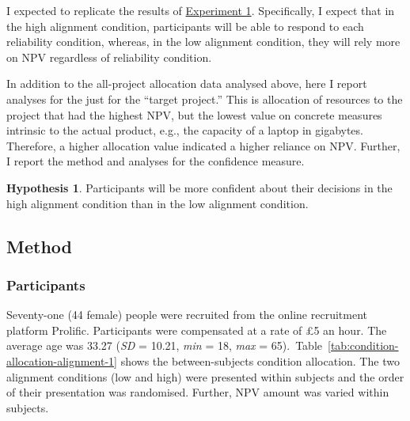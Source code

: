 \documentclass[a4paper, nobind, dvipsnames]{templates/ociamthesis}
\theoremstyle{definition}
\theoremstyle{definition}
\theoremstyle{definition}
\theoremstyle{definition}
\newtheorem{hypothesis}{Hypothesis}[chapter]
\theoremstyle{remark}
\begin{document}
I expected to replicate the results of \protect\hyperlink{results-alignment-2}{Experiment 1}.
Specifically, I expect that in the high alignment condition, participants will
be able to respond to each reliability condition, whereas, in the low alignment
condition, they will rely more on NPV regardless of reliability condition.

In addition to the all-project allocation data analysed above, here I report
analyses for the just for the ``target project.'' This is allocation of resources
to the project that had the highest NPV, but the lowest value on concrete
measures intrinsic to the actual product, e.g., the capacity of a laptop in
gigabytes. Therefore, a higher allocation value indicated a higher reliance on
NPV. Further, I report the method and analyses for the confidence measure.

\begin{hypothesis}
\protect\hypertarget{hyp:confidence-alignment-alignment-1}{}{\label{hyp:confidence-alignment-alignment-1} }Participants will be more confident about their decisions in the high alignment
condition than in the low alignment condition.
\end{hypothesis}

\hypertarget{method-alignment-1}{%
\subsection{Method}\label{method-alignment-1}}

\hypertarget{participants-10}{%
\subsubsection{Participants}\label{participants-10}}

Seventy-one (44 female) people were recruited from the online recruitment platform Prolific. Participants were compensated at a rate of £5 an hour. The average age was 33.27 (\emph{SD} = 10.21, \emph{min} = 18, \emph{max} = 65).~Table~\ref{tab:condition-allocation-alignment-1}
shows the between-subjects condition allocation. The two alignment conditions
(low and high) were presented within subjects and the order of their
presentation was randomised. Further, NPV amount was varied within subjects.
\end{document}
